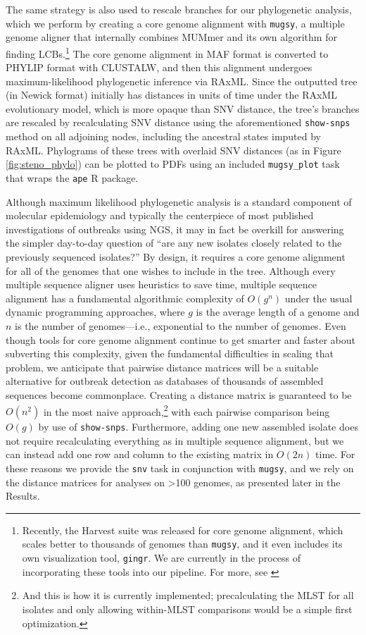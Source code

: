 The same strategy is also used to rescale branches for our phylogenetic analysis, which we perform by creating a core genome alignment with \texttt{mugsy}, a multiple genome aligner that internally combines MUMmer and its own algorithm for finding LCBs.\footnote[][-2cm]{Recently, the Harvest suite was released for core genome alignment, which scales better to thousands of genomes than \texttt{mugsy}, and it even includes its own visualization tool, \texttt{gingr}. We are currently in the process of incorporating these tools into our pipeline. For more, see \textcite{Treangen2014}} The core genome alignment in MAF format is converted to PHYLIP format with CLUSTALW,\autocite{Sievers2011} and then this alignment undergoes maximum-likelihood phylogenetic inference via RAxML.\autocite{Stamatakis2005} Since the outputted tree (in Newick format) initially has distances in units of time under the RAxML evolutionary model, which is more opaque than SNV distance, the tree's branches are rescaled by recalculating SNV distance using the aforementioned \texttt{show-snps} method on all adjoining nodes, including the ancestral states imputed by RAxML. Phylograms of these trees with overlaid SNV distances (as in Figure \ref{fig:steno_phylo}) can be plotted to PDFs using an included \verb|mugsy_plot| task that wraps the \texttt{ape} R package.

Although maximum likelihood phylogenetic analysis is a standard component of molecular epidemiology and typically the centerpiece of most published investigations of outbreaks using NGS,\autocite{Azarian2015,Eyre2012,Joensen2014,Casali2016} it may in fact be overkill for answering the simpler day-to-day question of ``are any new isolates closely related to the previously sequenced isolates?'' By design, it requires a core genome alignment for all of the genomes that one wishes to include in the tree. Although every multiple sequence aligner uses heuristics to save time, multiple sequence alignment has a fundamental algorithmic complexity of $O(g^n)$ under the usual dynamic programming approaches,\autocite{Just2004} where $g$ is the average length of a genome and $n$ is the number of genomes—i.e., exponential to the number of genomes. Even though tools for core genome alignment continue to get smarter and faster about subverting this complexity,\autocite{Treangen2014} given the fundamental difficulties in scaling that problem, we anticipate that pairwise distance matrices will be a suitable alternative for outbreak detection as databases of thousands of assembled sequences become commonplace. Creating a distance matrix is guaranteed to be $O(n^2)$ in the most naive approach,\footnote{And this is how it is currently implemented; precalculating the MLST for all isolates and only allowing within-MLST comparisons would be a simple first optimization.} with each pairwise comparison being $O(g)$ by use of \texttt{show-snps}. Furthermore, adding one new assembled isolate does not require recalculating everything as in multiple sequence alignment, but we can instead add one row and column to the existing matrix in $O(2n)$ time. For these reasons we provide the \verb|snv| task in conjunction with \verb|mugsy|, and we rely on the distance matrices for analyses on >100 genomes, as presented later in the Results.


